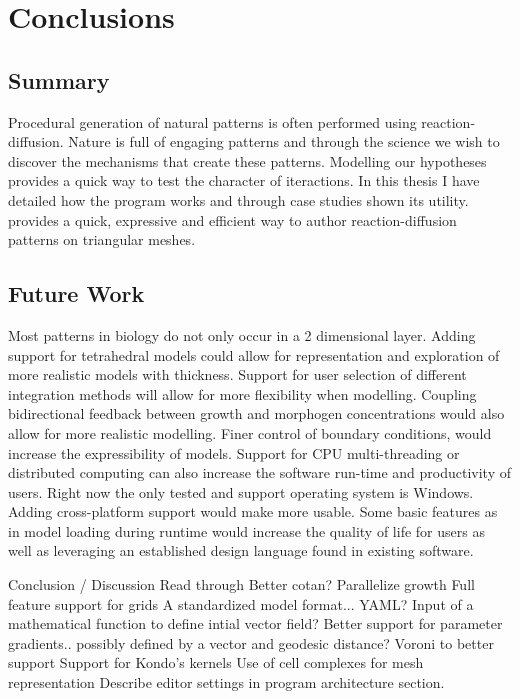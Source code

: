 \chapter{Conclusions}
\section{Summary}
Procedural generation of natural patterns is often performed using reaction-diffusion. Nature is full of engaging patterns and through the science we wish to discover the mechanisms that create these patterns. Modelling our hypotheses provides a quick way to test the character of iteractions. In this thesis I have detailed how the \ProgramName{} program works and through case studies shown its utility. \ProgramName{} provides a quick, expressive and efficient way to author reaction-diffusion patterns on triangular meshes. 

\section{Future Work}
Most patterns in biology do not only occur in a 2 dimensional layer. Adding support for tetrahedral models could allow for representation and exploration of more realistic models with thickness. Support for user selection of different integration methods will allow for more flexibility when modelling. Coupling bidirectional feedback between growth and morphogen concentrations would also allow for more realistic modelling. Finer control of boundary conditions, would increase the expressibility of models. Support for CPU multi-threading or distributed computing can also increase the software run-time and productivity of users. Right now the only tested and support operating system is Windows. Adding cross-platform support would make \ProgramName{} more usable. Some basic features as in model loading during runtime would increase the quality of life for users as well as leveraging an established design language found in existing software. 

Conclusion / Discussion
	Read through
	Better cotan?
	Parallelize growth
	Full feature support for grids
	A standardized model format... YAML?
	Input of a mathematical function to define intial vector field?
	Better support for parameter gradients.. possibly defined by a vector and geodesic distance?
	Voroni to better support
	Support for Kondo's kernels
	Use of cell complexes for mesh representation
	Describe editor settings in program architecture section.